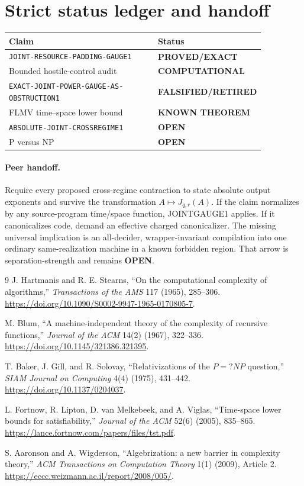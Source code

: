 \documentclass[11pt]{article}
\newcommand{\OPEN}{\textbf{OPEN}}
\newcommand{\EXACT}{\textbf{PROVED/EXACT}}
\newcommand{\COMP}{\textbf{COMPUTATIONAL}}
\newcommand{\RETIRED}{\textbf{FALSIFIED/RETIRED}}
\newcommand{\KNOWN}{\textbf{KNOWN THEOREM}}
\begin{document}
\section{Strict status ledger and handoff}

\begin{center}
\begin{tabular}{p{0.61\linewidth}p{0.25\linewidth}}
\toprule
Claim & Status \\
\midrule
\texttt{JOINT-RESOURCE-PADDING-GAUGE1} & \EXACT \\
Bounded hostile-control audit & \COMP \\
\texttt{EXACT-JOINT-POWER-GAUGE-AS-OBSTRUCTION1} & \RETIRED \\
FLMV time--space lower bound & \KNOWN \\
\texttt{ABSOLUTE-JOINT-CROSSREGIME1} & \OPEN \\
P versus NP & \OPEN \\
\bottomrule
\end{tabular}
\end{center}

\paragraph{Peer handoff.}
Require every proposed cross-regime contraction to state absolute output
exponents and survive the transformation $A\mapsto J_{q,r}(A)$.  If the claim
normalizes by any source-program time/space function, JOINTGAUGE1 applies.  If
it canonicalizes code, demand an effective charged canonicalizer.  The missing
universal implication is an all-decider, wrapper-invariant compilation into one
ordinary same-realization machine in a known forbidden region.  That arrow is
separation-strength and remains \OPEN.

\begin{thebibliography}{9}
J. Hartmanis and R. E. Stearns,
``On the computational complexity of algorithms,''
\emph{Transactions of the AMS} 117 (1965), 285--306.
\url{https://doi.org/10.1090/S0002-9947-1965-0170805-7}.

M. Blum,
``A machine-independent theory of the complexity of recursive functions,''
\emph{Journal of the ACM} 14(2) (1967), 322--336.
\url{https://doi.org/10.1145/321386.321395}.

T. Baker, J. Gill, and R. Solovay,
``Relativizations of the $P=?NP$ question,''
\emph{SIAM Journal on Computing} 4(4) (1975), 431--442.
\url{https://doi.org/10.1137/0204037}.

L. Fortnow, R. Lipton, D. van Melkebeek, and A. Viglas,
``Time-space lower bounds for satisfiability,''
\emph{Journal of the ACM} 52(6) (2005), 835--865.
\url{https://lance.fortnow.com/papers/files/tst.pdf}.

S. Aaronson and A. Wigderson,
``Algebrization: a new barrier in complexity theory,''
\emph{ACM Transactions on Computation Theory} 1(1) (2009), Article 2.
\url{https://eccc.weizmann.ac.il/report/2008/005/}.
\end{thebibliography}
\end{document}
